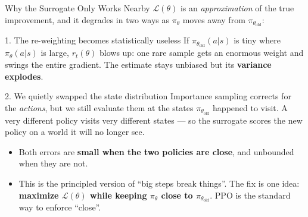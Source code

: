 \begin{frame}{Why the Surrogate Only Works Nearby}
$\mathcal{L}(\theta)$ is an \emph{approximation} of the true improvement, and it degrades in two ways as $\pi_\theta$ moves away from $\pi_{\theta_\text{old}}$:
\vspace{0.3em}
\begin{block}{1. The re-weighting becomes statistically useless}
If $\pi_{\theta_\text{old}}(a|s)$ is tiny where $\pi_\theta(a|s)$ is large, $r_t(\theta)$ blows up: one rare sample gets an enormous weight and swings the entire gradient. The estimate stays unbiased but its \textbf{variance explodes}.
\end{block}
\begin{block}{2. We quietly swapped the state distribution}
Importance sampling corrects for the \emph{actions}, but we still evaluate them at the states $\pi_{\theta_\text{old}}$ happened to visit. A very different policy visits very different states --- so the surrogate scores the new policy on a world it will no longer see.
\end{block}
\vspace{0.3em}
\begin{itemize}
    \item Both errors are \textbf{small when the two policies are close}, and unbounded when they are not.
    \item[$\Rightarrow$] This is the principled version of ``big steps break things''. The fix is one idea: \textbf{maximize $\mathcal{L}(\theta)$ while keeping $\pi_\theta$ close to $\pi_{\theta_\text{old}}$}. PPO is the standard way to enforce ``close''.
\end{itemize}
\end{frame}
